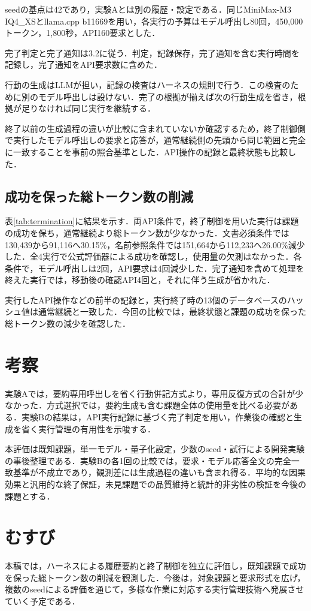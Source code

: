 \documentclass[letter]{ieicej}
\begin{document}
seedの基点は42であり，実験Aとは別の履歴・設定である．同じMiniMax-M3 IQ4\_XSとllama.cpp b11669を用い，各実行の予算はモデル呼出し80回，450,000トークン，1,800秒，API160要求とした．

完了判定と完了通知は3.2に従う．判定，記録保存，完了通知を含む実行時間を記録し，完了通知をAPI要求数に含めた．

行動の生成はLLMが担い，記録の検査はハーネスの規則で行う．この検査のために別のモデル呼出しは設けない．完了の根拠が揃えば次の行動生成を省き，根拠が足りなければ同じ実行を継続する．

終了以前の生成過程の違いが比較に含まれていないか確認するため，終了制御側で実行したモデル呼出しの要求と応答が，通常継続側の先頭から同じ範囲と完全に一致することを事前の照合基準とした．API操作の記録と最終状態も比較した．

\subsection{成功を保った総トークン数の削減}

表\ref{tab:termination}に結果を示す．両API条件で，終了制御を用いた実行は課題の成功を保ち，通常継続より総トークン数が少なかった．文書必須条件では130,439から91,116へ30.15\%，名前参照条件では151,664から112,233へ26.00\%減少した．全4実行で公式評価器による成功を確認し，使用量の欠測はなかった．各条件で，モデル呼出しは2回，API要求は4回減少した．完了通知を含めて処理を終えた実行では，移動後の確認API4回と，それに伴う生成が省かれた．

\TerminationResultsTable

\par\noindent\begin{minipage}{\columnwidth}
実行したAPI操作などの前半の記録と，実行終了時の13個のデータベースのハッシュ値は通常継続と一致した．今回の比較では，最終状態と課題の成功を保った総トークン数の減少を確認した．
\end{minipage}\par{}

\section{考察}

実験Aでは，要約専用呼出しを省く行動併記方式より，専用反復方式の合計が少なかった．方式選択では，要約生成も含む課題全体の使用量を比べる必要がある．実験Bの結果は，API実行記録に基づく完了判定を用い，作業後の確認と生成を省く実行管理の有用性を示唆する．

本評価は既知課題，単一モデル・量子化設定，少数のseed・試行による開発実験の事後整理である．実験Bの各1回の比較では，要求・モデル応答全文の完全一致基準が不成立であり，観測差には生成過程の違いも含まれ得る．平均的な因果効果と汎用的な終了保証，未見課題での品質維持と統計的非劣性の検証を今後の課題とする．

\section{むすび}

本稿では，ハーネスによる履歴要約と終了制御を独立に評価し，既知課題で成功を保った総トークン数の削減を観測した．今後は，対象課題と要求形式を広げ，複数のseedによる評価を通じて，多様な作業に対応する実行管理技術へ発展させていく予定である．


\end{document}
